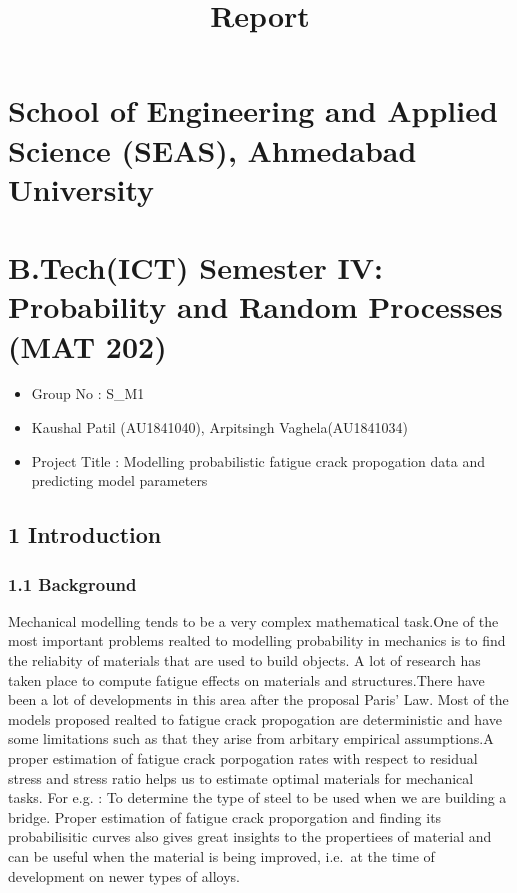 \documentclass[11pt]{article}
\title{Report}
\providecommand{\tightlist}{%
      \setlength{\itemsep}{0pt}\setlength{\parskip}{0pt}}
\begin{document}
    
    \maketitle
    
    

    
    \hypertarget{school-of-engineering-and-applied-science-seas-ahmedabad-university}{%
\section{School of Engineering and Applied Science (SEAS), Ahmedabad
University}\label{school-of-engineering-and-applied-science-seas-ahmedabad-university}}

\hypertarget{b.techict-semester-iv-probability-and-random-processes-mat-202}{%
\section{B.Tech(ICT) Semester IV: Probability and Random Processes (MAT
202)}\label{b.techict-semester-iv-probability-and-random-processes-mat-202}}

\begin{itemize}
\tightlist
\item
  Group No : S\_M1
\item
  Kaushal Patil (AU1841040), Arpitsingh Vaghela(AU1841034)
\item
  Project Title : Modelling probabilistic fatigue crack propogation data
  and predicting model parameters
\end{itemize}

\hypertarget{introduction}{%
\subsection{1 Introduction}\label{introduction}}

\hypertarget{background}{%
\subsubsection{1.1 Background}\label{background}}

Mechanical modelling tends to be a very complex mathematical task.One of
the most important problems realted to modelling probability in
mechanics is to find the reliabity of materials that are used to build
objects. A lot of research has taken place to compute fatigue effects on
materials and structures.There have been a lot of developments in this
area after the proposal Paris' Law. Most of the models proposed realted
to fatigue crack propogation are deterministic and have some limitations
such as that they arise from arbitary empirical assumptions.A proper
estimation of fatigue crack porpogation rates with respect to residual
stress and stress ratio helps us to estimate optimal materials for
mechanical tasks. For e.g. : To determine the type of steel to be used
when we are building a bridge. Proper estimation of fatigue crack
proporgation and finding its probabilisitic curves also gives great
insights to the propertiees of material and can be useful when the
material is being improved, i.e.~at the time of development on newer
types of alloys.
\end{document}
